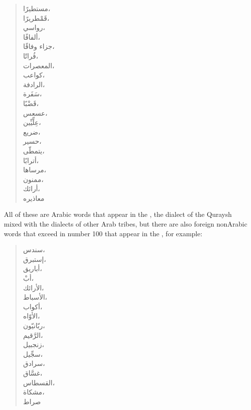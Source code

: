 \documentclass[12pt]{memoir}
\begin{document}
\begin{quote}
\begin{Arabic}
\begin{multicols}{3}
مستطيرًا،\\
قَمْطريرًا،\\
رواسي،\\
ألفافًا،\\
جزاء وفاقًا،\\
فُراتًا،\\
المعصرات،\\
كواعب،\\
الرادفة،\\
سَفَرة،\\
قَضْبًا،\\
عسعس،\\
عِلِّيِّين،\\
ضريع،\\
حسير،\\
يتمطّى،\\
أترابًا،\\
مرساها،\\
ممنون،\\
أرائك،\\
معاذيره\fnmark
\end{multicols}
\end{Arabic}
\end{quote}


All of these are Arabic words that appear in the \Quran,
the dialect of the Quraysh mixed with the dialects of other Arab tribes,
but there are also foreign non\–Arabic words that exceed in number 100
that appear in the \Quran, for example:

\begin{quote}
\begin{Arabic}
\begin{multicols}{3}\raggedleft
سندس،\\
إستبرق،\\
أباريق،\\
أبْ،\\
الأرائك،\\
الأسباط،\\
أكواب،\\
الأوّاه،\\
ربّانيّون،\\
الرَّقيم،\\
زنجبيل،\\
سجِّيل،\\
سرادق،\\
غسَّاق،\\
القسطاس،\\
مشكاة،\\
صراط
\end{multicols}
\end{Arabic}
\end{quote}
\end{document}
